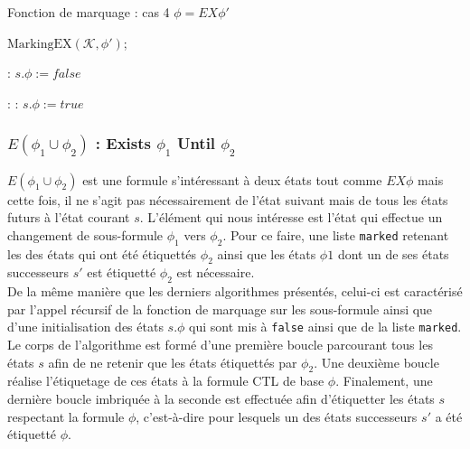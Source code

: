 \documentclass[runningheads,a4paper,10pt]{llncs}
\newcommand{\var}[1]{\mathit{#1}}
\newcommand{\func}[1]{\mathrm{#1}}
\begin{document}
\begin{algorithm}
  \caption{Fonction de marquage : cas 4 $\phi = EX\phi '$}\label{euclid}
  \begin{algorithmic}[1]
  \State $\func{MarkingEX}(\mathcal{K}, \phi ')$;
  
  \ForAll{$\var{s}$ in $\var{S}$}:
  \State $s.\phi := false$
  \EndFor
  
  \ForAll{$\var{(s,s')} \in \rightarrow$}:
  :
  \State $s.\phi := true$
  \EndIf  
  \EndFor
  
  \EndProcedure
  \end{algorithmic}
\end{algorithm}

\subsubsection{$E(\phi_{1} \cup \phi_{2})$ : Exists $\phi_{1}$ Until $\phi_{2}$}

$E(\phi_{1} \cup \phi_{2})$ est une formule s'intéressant à deux états tout comme $EX\phi$ mais cette fois, il ne s'agit pas nécessairement de l'état suivant mais de tous les états futurs à l'état courant $s$. L'élément qui nous intéresse est l'état qui effectue un changement de sous-formule $\phi_{1}$ vers $\phi_{2}$. Pour ce faire, une liste \texttt{marked} retenant les des états qui ont été étiquettés $\phi_{2}$ ainsi que les états $\phi{1}$ dont un de ses états successeurs $s'$ est étiquetté $\phi_{2}$ est nécessaire. \\
De la même manière que les derniers algorithmes présentés, celui-ci est caractérisé par l'appel récursif de la fonction de marquage sur les sous-formule ainsi que d'une initialisation des états $s.\phi$ qui sont mis à \texttt{false} ainsi que de la liste \texttt{marked}. Le corps de l'algorithme est formé d'une première boucle parcourant tous les états $s$ afin de ne retenir que les états étiquettés par $\phi_{2}$. Une deuxième boucle réalise l'étiquetage de ces états à la formule CTL de base $\phi$. Finalement, une dernière boucle imbriquée à la seconde est effectuée afin d'étiquetter les états $s$ respectant la formule $\phi$, c'est-à-dire pour lesquels un des états successeurs $s'$ a été étiquetté $\phi$. 
   
\end{document}

